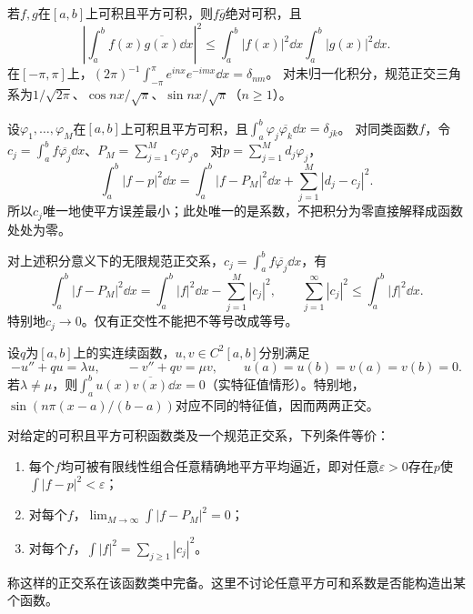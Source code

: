 \begin{result}[Schwarz不等式与正交关系]\label{st:inner}
若$f,g$在$[a,b]$上可积且平方可积，则$f\overline g$绝对可积，且
\[
 \left|\int_a^bf(x)\overline{g(x)}\dd x\right|^2
 \le\int_a^b|f(x)|^2\dd x\int_a^b|g(x)|^2\dd x.
\]
在$[-\pi,\pi]$上，$(2\pi)^{-1}\int_{-\pi}^{\pi}e^{inx}e^{-imx}\dd x=\delta_{nm}$。
对未归一化积分，规范正交三角系为$1/\sqrt{2\pi}$、$\cos nx/\sqrt\pi$、$\sin nx/\sqrt\pi$（$n\ge1$）。
\end{result}
\begin{result}[正交投影与最佳平方逼近]\label{st:projection}
设$\varphi_1,\ldots,\varphi_M$在$[a,b]$上可积且平方可积，且$\int_a^b\varphi_j\overline{\varphi_k}\dd x=\delta_{jk}$。
对同类函数$f$，令$c_j=\int_a^bf\overline{\varphi_j}\dd x$、$P_M=\sum_{j=1}^Mc_j\varphi_j$。
对$p=\sum_{j=1}^Md_j\varphi_j$，
\[
 \int_a^b|f-p|^2\dd x=\int_a^b|f-P_M|^2\dd x+\sum_{j=1}^M|d_j-c_j|^2.
\]
所以$c_j$唯一地使平方误差最小；此处唯一的是系数，不把积分为零直接解释成函数处处为零。
\end{result}
\begin{result}[Bessel不等式及误差恒等式]\label{st:bessel}
对上述积分意义下的无限规范正交系，$c_j=\int_a^bf\overline{\varphi_j}\dd x$，有
\[
 \int_a^b|f-P_M|^2\dd x=\int_a^b|f|^2\dd x-\sum_{j=1}^M|c_j|^2,
 \qquad\sum_{j=1}^\infty|c_j|^2\le\int_a^b|f|^2\dd x.
\]
特别地$c_j\to0$。仅有正交性不能把不等号改成等号。
\end{result}
\begin{result}[分部积分产生的正交性]\label{st:Sturm}
设$q$为$[a,b]$上的实连续函数，$u,v\in C^2[a,b]$分别满足
\[
 -u''+qu=\lambda u,\qquad -v''+qv=\mu v,\qquad
 u(a)=u(b)=v(a)=v(b)=0.
\]
若$\lambda\ne\mu$，则$\int_a^bu(x)\overline{v(x)}\dd x=0$（实特征值情形）。特别地，$\sin(n\pi(x-a)/(b-a))$对应不同的特征值，因而两两正交。
\end{result}
\begin{result}\label{st:complete}
对给定的可积且平方可积函数类及一个规范正交系，下列条件等价：
\begin{enumerate}[label=(\arabic*)]
\item 每个$f$均可被有限线性组合任意精确地平方平均逼近，即对任意$\varepsilon>0$存在$p$使$\int|f-p|^2<\varepsilon$；
\item 对每个$f$，$\lim_{M\to\infty}\int|f-P_M|^2=0$；
\item 对每个$f$，$\int|f|^2=\sum_{j\ge1}|c_j|^2$。
\end{enumerate}
称这样的正交系在该函数类中完备。这里不讨论任意平方可和系数是否能构造出某个函数。
\end{result}


